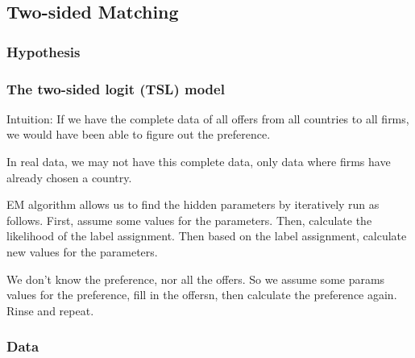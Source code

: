 \subsection{Two-sided Matching}

\subsubsection{Hypothesis}

\subsubsection{The two-sided logit (TSL) model}

Intuition: If we have the complete data of all offers from all countries to all firms, we would have been able to figure out the preference.

In real data, we may not have this complete data, only data where firms have already chosen a country.

EM algorithm allows us to find the hidden parameters by iteratively run as follows. First, assume some values for the parameters. Then, calculate the likelihood of the label assignment. Then based on the label assignment, calculate new values for the parameters.

We don't know the preference, nor all the offers. So we assume some params values for the preference, fill in the offersn, then calculate the preference again. Rinse and repeat.

\subsubsection{Data}
